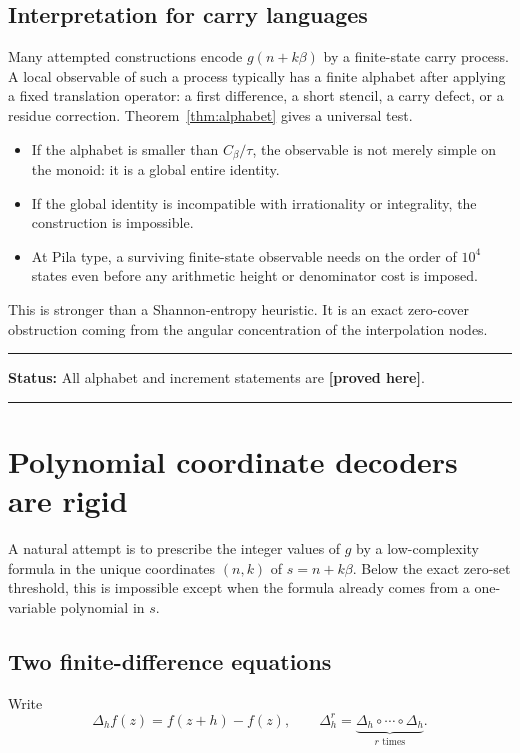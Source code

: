 \documentclass[11pt,oneside]{article}
\theoremstyle{definition}
\theoremstyle{remark}
\newcommand{\Cbeta}{C_\beta}
\newcommand{\Del}[1]{\Delta_{#1}}
\newcommand{\statusproved}{\textcolor{provedgreen}{\textbf{[proved here]}}}
\newenvironment{statusbox}[1]
{\begin{center}\begin{minipage}{0.94\textwidth}\raggedright\hrule\vspace{0.45em}\textbf{Status:} #1\par\vspace{0.35em}}
{\vspace{0.35em}\hrule\end{minipage}\end{center}}
\begin{document}
\subsection{Interpretation for carry languages}

Many attempted constructions encode $g(n+k\beta)$ by a finite-state carry process.  A local
observable of such a process typically has a finite alphabet after applying a fixed
translation operator: a first difference, a short stencil, a carry defect, or a residue
correction.  Theorem~\ref{thm:alphabet} gives a universal test.

\begin{itemize}
\item If the alphabet is smaller than $\Cbeta/\tau$, the observable is not merely simple
on the monoid: it is a global entire identity.
\item If the global identity is incompatible with irrationality or integrality, the
construction is impossible.
\item At Pila type, a surviving finite-state observable needs on the order of
$10^4$ states even before any arithmetic height or denominator cost is imposed.
\end{itemize}

This is stronger than a Shannon-entropy heuristic.  It is an exact zero-cover obstruction
coming from the angular concentration of the interpolation nodes.

\begin{statusbox}{All alphabet and increment statements are \statusproved.}
\end{statusbox}

\section{Polynomial coordinate decoders are rigid}
\label{sec:polydecoder}

A natural attempt is to prescribe the integer values of $g$ by a low-complexity formula in
the unique coordinates $(n,k)$ of $s=n+k\beta$.  Below the exact zero-set threshold, this
is impossible except when the formula already comes from a one-variable polynomial in
$s$.

\subsection{Two finite-difference equations}

Write
\[
 \Del{h}f(z)=f(z+h)-f(z),
 \qquad
 \Del{h}^{r}=\underbrace{\Del{h}\circ\cdots\circ\Del{h}}_{r\text{ times}}.
\]
\end{document}
